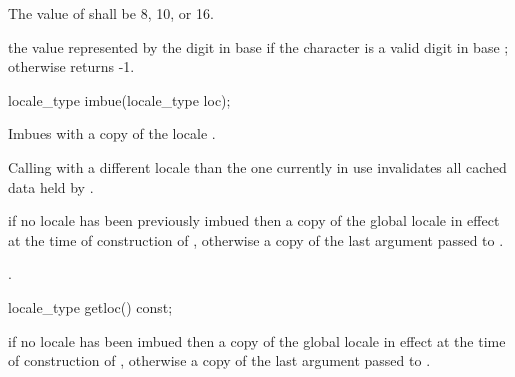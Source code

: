 \begin{itemdescr}
\pnum
\precondition  The value of  shall be 8, 10, or 16.

\pnum
\returns  the value represented by the digit  in base
 if the character  is a valid digit in base
; otherwise returns -1.
\end{itemdescr}

%
%
\begin{itemdecl}
locale_type imbue(locale_type loc); 
\end{itemdecl}

\begin{itemdescr}
\pnum
\effects  Imbues  with a copy of the
locale . \begin{note} Calling  with a
different locale than the one currently in use invalidates all cached
data held by . \end{note}

\pnum
\returns  if no locale has been previously imbued then a copy of the
global locale in effect at the time of construction of ,
otherwise a copy of the last argument passed to .

\pnum
\postcondition  {}.
\end{itemdescr}

%
%
\begin{itemdecl}
locale_type getloc() const;
\end{itemdecl}

\begin{itemdescr}
\pnum
\returns  if no locale has been imbued then a copy of the global locale
in effect at the time of construction of , otherwise a copy of
the last argument passed to .
\end{itemdescr}

